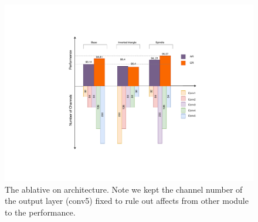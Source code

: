 \begin{figure}[!t]
	\centering
	\includegraphics[width=\linewidth]{figures/archabl.pdf}
	\caption
    {The ablative on architecture. Note we kept the channel number of the output layer (conv5) fixed to rule out affects from other module to the performance.}
	\label{fig:archabl}
\end{figure}